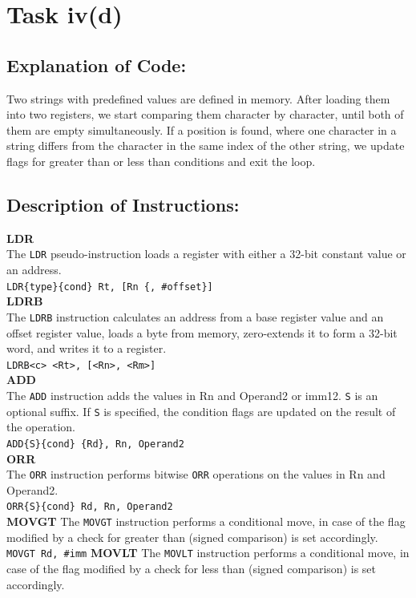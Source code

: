 \documentclass[12pt]{article}
\begin{document}
\section{Task iv(d)}
\subsection{Explanation of Code:}
Two strings with predefined values are defined in memory. After loading them into two registers, we start comparing them character by character, until both of them are empty simultaneously. If a position is found, where one character in a string differs from the character in the same index of the other string, we update flags for greater than or less than conditions and exit the loop.
\subsection{Description of Instructions:}
\textbf{LDR}\\
The \verb|LDR| pseudo-instruction loads a register with either a 32-bit constant value or an address.\\
\verb|LDR{type}{cond} Rt, [Rn {, #offset}]| \\
\textbf{LDRB}\\
The \verb|LDRB| instruction calculates an address from a base register value and an offset register value, loads a byte from memory, zero-extends it to form a 32-bit word, and writes it to a register. \\
\verb|LDRB<c> <Rt>, [<Rn>, <Rm>]|\\
\textbf{ADD}\\
The \verb|ADD| instruction adds the values in Rn and Operand2 or imm12. \verb|S| is an optional suffix. If \verb|S| is specified, the condition flags are updated on the result of the operation.\\
\verb|ADD{S}{cond} {Rd}, Rn, Operand2|\\
\textbf{ORR}\\
The \verb|ORR| instruction performs bitwise \verb|ORR| operations on the values in Rn and Operand2.\\
\verb|ORR{S}{cond} Rd, Rn, Operand2|\\
\textbf{MOVGT}
The \verb|MOVGT| instruction performs a conditional move, in case of the flag modified by a check for greater than (signed comparison) is set accordingly.
\verb|MOVGT Rd, #imm|
\textbf{MOVLT}
The \verb|MOVLT| instruction performs a conditional move, in case of the flag modified by a check for less than (signed comparison) is set accordingly.
\end{document}
